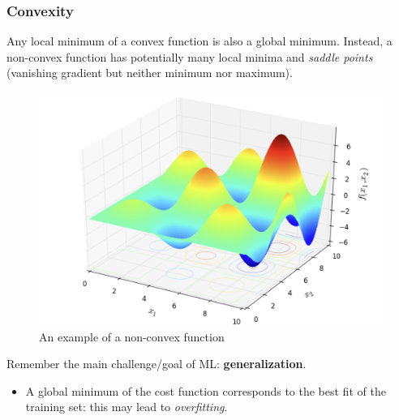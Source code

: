 \documentclass{beamer}
\begin{document}
%		
%		

	\begin{frame}
		\frametitle{Convexity}
		Any local minimum of a convex function is also a global minimum. 
		Instead, a non-convex function has potentially many local minima and \textit{saddle points} (vanishing gradient but neither minimum nor maximum).
		
		\begin{figure}
			\centering
			\includegraphics[scale=0.25]{images/non_convex}
			\caption{An example of a non-convex function}
		\end{figure}
		
		Remember the main challenge/goal of ML: \textbf{generalization}.
		
		\begin{itemize}
			\item A global minimum of the cost function corresponds to the best fit of the training set: this may lead to \textit{overfitting}.
		\end{itemize}
	\end{frame}

%		
%		
%		
\end{document}

